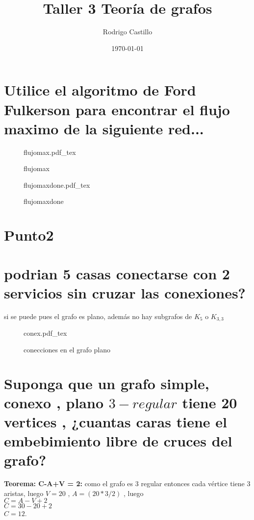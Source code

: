 \documentclass[10pt,a4paper]{article} %
\newcommand{\incfig}[1]{%
    \def\svgwidth{\columnwidth}
    {#1.pdf_tex}
}
\begin{document}
\title{{  Taller 3 Teoría de grafos}}
    \author{{Rodrigo Castillo}}
    \date{\today}

    \maketitle


    \section{Utilice el algoritmo de Ford Fulkerson para encontrar el flujo maximo de la siguiente red...}

\begin{figure}[ht]
    \centering
    \incfig{flujomax}
    \caption{flujomax}
    \label{fig:flujomax}
\end{figure}

\begin{figure}[ht]
    \centering
    \incfig{flujomaxdone}
    \caption{flujomaxdone}
    \label{fig:flujomaxdone}
\end{figure}

    \section{Punto2 }





    \newpage
    \section{podrian 5 casas conectarse con 2 servicios sin cruzar las conexiones?}
    si se puede pues el grafo es plano, además no hay subgrafos de $K_5$ o $K_{3,3}$
    \begin{figure}[ht]
        \centering
        \incfig{conex}
        \caption{conecciones en el grafo plano}
        \label{fig:conex}
    \end{figure}


    \section{Suponga que un grafo simple, conexo , plano $3-regular$ tiene 20
    vertices , ¿cuantas caras tiene el embebimiento libre de cruces del grafo?}
        \textbf{Teorema: C-A+V = 2: }
        como el grafo es 3 regular entonces cada vértice tiene 3 aristas, luego
        $V=20$ , $A=(20*3/2)$ , luego
        \\
        $ C = A -V +2$
        \\
        $C = 30 -20 +2 $
        \\
        $C = 12$.
\end{document}
